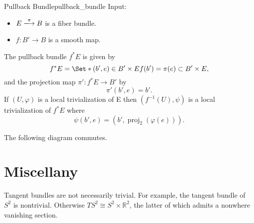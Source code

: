 \documentclass{article}
\begin{document}
\begin{definition}{Pullback Bundle}{pullback_bundle}
    Input:
    \begin{itemize}
        \item $E\xlongrightarrow{\pi} B$ is a fiber bundle.
        \item $f: B' \rightarrow B$ is a smooth map.
    \end{itemize}
    The pullback bundle $f^* E$ is given by
    \[ f^*E = \Set*{(b', e)\in B'\times E}{f(b') = \pi(e)} \subset B'\times E, \]
    and the projection map $\pi': f^*E \rightarrow B'$ by
    \[ \pi'(b', e) = b'. \]
    If $(U,\varphi)$ is a local trivialization of E then $(f^{-1}(U),\psi)$ is a local trivialization of $f^* E$ where
    \[ \psi(b', e) = (b', \operatorname{proj}_2(\varphi(e))). \]
\end{definition}

The following diagram commutes.
\begin{center}
\end{center}

\section*{Miscellany}

Tangent bundles are not necessarily trivial.
For example, the tangent bundle of $S^2$ is nontrivial.
Otherwise $TS^2 \cong S^2\times \mathbb{R}^2$, the latter of which admits a nonwhere vanishing section.

% 
% 
\end{document}

